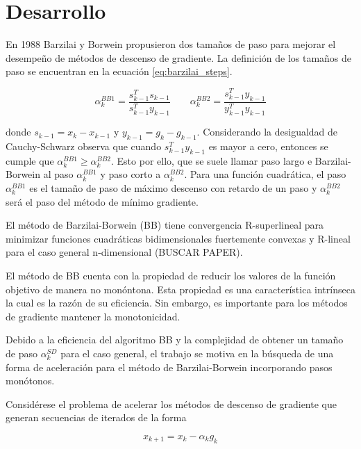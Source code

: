 
\section*{Desarrollo}

En 1988 Barzilai y Borwein propusieron dos tamaños de paso para mejorar el desempeño de métodos de descenso de gradiente. La definición de los tamaños de paso se encuentran en la ecuación \ref{eq:barzilai_steps}.

\begin{equation}
	\alpha^{BB1}_k = \frac{s^T_{k-1}s_{k-1}}{s^T_{k-1}y_{k-1}} \qquad \alpha_k^{BB2} = \frac{s_{k-1}^Ty_{k-1}}{y_{k-1}^Ty_{k-1}} \label{eq:barzilai_steps}
\end{equation}

donde $s_{k-1} = x_k - x_{k-1}$ y $y_{k-1} = g_k - g_{k-1}$. Considerando la desigualdad de Cauchy-Schwarz observa que cuando $s_{k-1}^Ty_{k-1}$ es mayor a cero, entonces se cumple que $\alpha_k^{BB1} \geq \alpha_k^{BB2}$. Esto por ello, que se suele llamar paso largo e Barzilai-Borwein al paso $\alpha_k^{BB1}$ y paso corto a $\alpha_k^{BB2}$. Para una función cuadrática, el paso $\alpha_k^{BB1}$ es el tamaño de paso de máximo descenso con retardo de un paso y $\alpha_k^{BB2}$ será el paso del método de mínimo gradiente.

El método de Barzilai-Borwein (BB) tiene convergencia R-superlineal para minimizar funciones cuadráticas bidimensionales fuertemente convexas y R-lineal para el caso general n-dimensional (BUSCAR PAPER).

El método de BB cuenta con la propiedad de reducir los valores de la función objetivo de manera no monóntona. Esta propiedad es una característica intrínseca la cual es la razón de su eficiencia. Sin embargo, es importante para los métodos de gradiente mantener la monotonicidad.

Debido a la eficiencia del algoritmo BB y la complejidad de obtener un tamaño de paso $\alpha_k^{SD}$ para el caso general, el trabajo se motiva en la búsqueda de una forma de aceleración para el método de Barzilai-Borwein incorporando pasos monótonos.

Considérese el problema de acelerar los métodos de descenso de gradiente que generan secuencias de iterados de la forma

\begin{equation*}
	x_{k+1} = x_k - \alpha_k g_k
\end{equation*}

